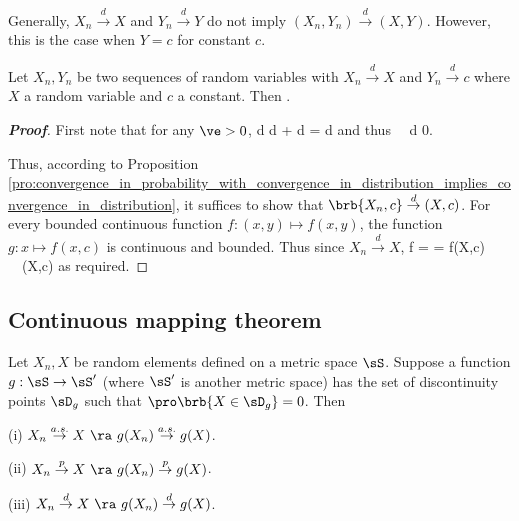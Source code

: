 Generally, $X_n \stackrel{d}{\to }X$ and $Y_n \stackrel{d}{\to }Y$ do not imply $(X_n,Y_n) \stackrel{d}{\to }(X,Y)$. However, this is the case when $Y = c$ for constant $c$.


\begin{proposition}\label{pro:joint_convergence_in_distribution_constant}
Let $X_n,Y_n$ be two sequences of random variables with $X_n \stackrel{d}{\to }X$ and $Y_n \stackrel{d}{\to}c$ where $X$ a random variable and $c$ a constant. Then
\be
{}  .
\ee
\end{proposition}

\begin{proof}[\bf Proof]%
First note that for any $\ve>0$,
\be
d \leq d + d = d
\ee
and thus
\be
\pro{} \leq \pro{}  \ \ra\  d  0.
\ee

Thus, according to Proposition \ref{pro:convergence_in_probability_with_convergence_in_distribution_implies_convergence_in_distribution},
it suffices to show that $\brb{X_n,c}\stackrel{d}{\to}(X,c)$. For every bounded continuous function $f: (x,y)\mapsto f(x,y)$, the function $g:x\mapsto f(x,c)$ is continuous and bounded. Thus since $X_n \stackrel{d}{\to} X$,
\be
\E f = \E{} \to \E{} = \E f(X,c) \ \ra\ (X,c)
\ee
as required.
\end{proof}





\subsection{Continuous mapping theorem}


\begin{theorem}\label{thm:continuous_mapping_probability}
Let $X_n,X$ be random elements defined on a metric space $\sS$. Suppose a function $g: \sS\to \sS'$ (where $\sS'$ is another metric space) has the set of discontinuity points $\sD_g$ such that $\pro\brb{X\in \sD_g} = 0$. Then
\ben
\item [(i)]  $X_{n} \stackrel{a.s.}{\to} X \ \ra\  g(X_{n})\stackrel{a.s.}{\to} g(X)$.
\item [(ii)] $X_{n} \stackrel{p}{\to} X \ \ra\  g(X_{n})\stackrel{p}{\to} g(X)$.
\item [(iii)] $X_{n} \stackrel{d}{\to} X \ \ra\  g(X_{n})\stackrel{d}{\to} g(X)$.
\een
\end{theorem}

